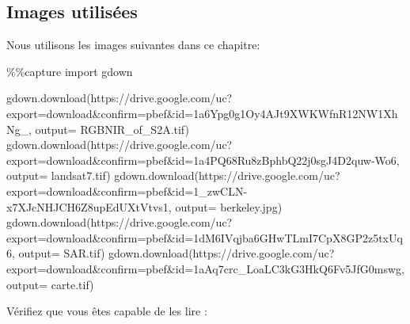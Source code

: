 \documentclass[
  11pt,
  letterpaper,
  open=any,
  twoside=false,
  french]{scrbook}
\newenvironment{Shaded}{\begin{snugshade}}{\end{snugshade}}
\newcommand{\ImportTok}[1]{\textcolor[rgb]{0.00,0.46,0.62}{#1}}
\newcommand{\NormalTok}[1]{\textcolor[rgb]{0.00,0.23,0.31}{#1}}
\newcommand{\OperatorTok}[1]{\textcolor[rgb]{0.37,0.37,0.37}{#1}}
\newcommand{\StringTok}[1]{\textcolor[rgb]{0.13,0.47,0.30}{#1}}
\begin{document}
\subsection{Images utilisées}\label{images-utilisuxe9es-2}

Nous utilisons les images suivantes dans ce chapitre:

\begin{Shaded}
\begin{Highlighting}[]
\OperatorTok{\%\%}\NormalTok{capture}
\ImportTok{import}\NormalTok{ gdown}

\NormalTok{gdown.download(}\StringTok{\textquotesingle{}https://drive.google.com/uc?export=download\&confirm=pbef\&id=1a6Ypg0g1Oy4AJt9XWKWfnR12NW1XhNg\_\textquotesingle{}}\NormalTok{, output}\OperatorTok{=} \StringTok{\textquotesingle{}RGBNIR\_of\_S2A.tif\textquotesingle{}}\NormalTok{)}
\NormalTok{gdown.download(}\StringTok{\textquotesingle{}https://drive.google.com/uc?export=download\&confirm=pbef\&id=1a4PQ68Ru8zBphbQ22j0sgJ4D2quw{-}Wo6\textquotesingle{}}\NormalTok{, output}\OperatorTok{=} \StringTok{\textquotesingle{}landsat7.tif\textquotesingle{}}\NormalTok{)}
\NormalTok{gdown.download(}\StringTok{\textquotesingle{}https://drive.google.com/uc?export=download\&confirm=pbef\&id=1\_zwCLN{-}x7XJcNHJCH6Z8upEdUXtVtvs1\textquotesingle{}}\NormalTok{, output}\OperatorTok{=} \StringTok{\textquotesingle{}berkeley.jpg\textquotesingle{}}\NormalTok{)}
\NormalTok{gdown.download(}\StringTok{\textquotesingle{}https://drive.google.com/uc?export=download\&confirm=pbef\&id=1dM6IVqjba6GHwTLmI7CpX8GP2z5txUq6\textquotesingle{}}\NormalTok{, output}\OperatorTok{=} \StringTok{\textquotesingle{}SAR.tif\textquotesingle{}}\NormalTok{)}
\NormalTok{gdown.download(}\StringTok{\textquotesingle{}https://drive.google.com/uc?export=download\&confirm=pbef\&id=1aAq7crc\_LoaLC3kG3HkQ6Fv5JfG0mswg\textquotesingle{}}\NormalTok{, output}\OperatorTok{=} \StringTok{\textquotesingle{}carte.tif\textquotesingle{}}\NormalTok{)}
\end{Highlighting}
\end{Shaded}

Vérifiez que vous êtes capable de les lire :
\end{document}
